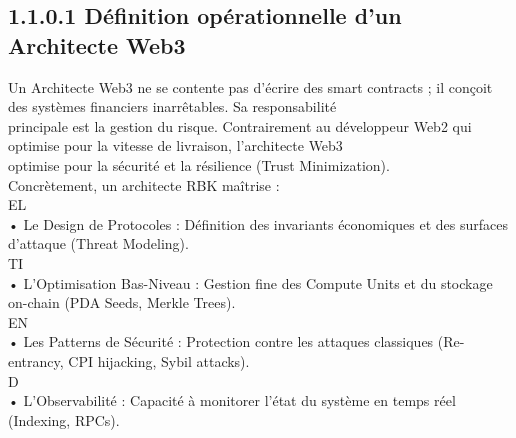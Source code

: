 \documentclass[12pt,landscape,a4paper]{article}
\begin{document}
\subsection{1.1.0.1 Définition opérationnelle d’un Architecte Web3}
\vspace{0.5em}
Un Architecte Web3 ne se contente pas d’écrire des smart contracts ; il conçoit des systèmes financiers inarrêtables. Sa responsabilité\\
principale est la gestion du risque. Contrairement au développeur Web2 qui optimise pour la vitesse de livraison, l’architecte Web3\\
optimise pour la sécurité et la résilience (Trust Minimization).\\
Concrètement, un architecte RBK maîtrise :\\
\vspace{0.5em}
\vspace{0.5em}
\vspace{0.5em}
\vspace{0.5em}
EL\\
• Le Design de Protocoles : Définition des invariants économiques et des surfaces d’attaque (Threat Modeling).\\
\vspace{0.5em}
\vspace{0.5em}
\vspace{0.5em}
\vspace{0.5em}
TI\\
• L’Optimisation Bas-Niveau : Gestion fine des Compute Units et du stockage on-chain (PDA Seeds, Merkle Trees).\\
\vspace{0.5em}
\vspace{0.5em}
\vspace{0.5em}
\vspace{0.5em}
EN\\
• Les Patterns de Sécurité : Protection contre les attaques classiques (Re-entrancy, CPI hijacking, Sybil attacks).\\
\vspace{0.5em}
\vspace{0.5em}
\vspace{0.5em}
\vspace{0.5em}
D\\
• L’Observabilité : Capacité à monitorer l’état du système en temps réel (Indexing, RPCs).\\
\vspace{0.5em}
\vspace{0.5em}
\vspace{0.5em}
\end{document}
